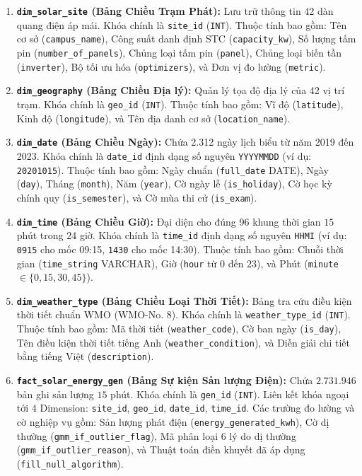 \documentclass[12pt, a4paper]{report}
\begin{document}
\begin{enumerate}[label=\arabic*., leftmargin=*]
    \item \textbf{\texttt{dim\_solar\_site} (Bảng Chiều Trạm Phát):} Lưu trữ thông tin 42 dàn quang điện áp mái. Khóa chính là \texttt{site\_id} (\texttt{INT}). Thuộc tính bao gồm: Tên cơ sở (\texttt{campus\_name}), Công suất danh định STC (\texttt{capacity\_kw}), Số lượng tấm pin (\texttt{number\_of\_panels}), Chủng loại tấm pin (\texttt{panel}), Chủng loại biến tần (\texttt{inverter}), Bộ tối ưu hóa (\texttt{optimizers}), và Đơn vị đo lường (\texttt{metric}).
    
    \item \textbf{\texttt{dim\_geography} (Bảng Chiều Địa lý):} Quản lý tọa độ địa lý của 42 vị trí trạm. Khóa chính là \texttt{geo\_id} (\texttt{INT}). Thuộc tính bao gồm: Vĩ độ (\texttt{latitude}), Kinh độ (\texttt{longitude}), và Tên địa danh cơ sở (\texttt{location\_name}).
    
    \item \textbf{\texttt{dim\_date} (Bảng Chiều Ngày):} Chứa 2.312 ngày lịch biểu từ năm 2019 đến 2023. Khóa chính là \texttt{date\_id} định dạng số nguyên \texttt{YYYYMMDD} (ví dụ: \texttt{20201015}). Thuộc tính bao gồm: Ngày chuẩn (\texttt{full\_date} DATE), Ngày (\texttt{day}), Tháng (\texttt{month}), Năm (\texttt{year}), Cờ ngày lễ (\texttt{is\_holiday}), Cờ học kỳ chính quy (\texttt{is\_semester}), và Cờ mùa thi cử (\texttt{is\_exam}).
    
    \item \textbf{\texttt{dim\_time} (Bảng Chiều Giờ):} Đại diện cho đúng 96 khung thời gian $15$ phút trong 24 giờ. Khóa chính là \texttt{time\_id} định dạng số nguyên \texttt{HHMI} (ví dụ: \texttt{0915} cho mốc 09:15, \texttt{1430} cho mốc 14:30). Thuộc tính bao gồm: Chuỗi thời gian (\texttt{time\_string} VARCHAR), Giờ (\texttt{hour} từ $0$ đến $23$), và Phút (\texttt{minute} $\in \{0, 15, 30, 45\}$).
    
    \item \textbf{\texttt{dim\_weather\_type} (Bảng Chiều Loại Thời Tiết):} Bảng tra cứu điều kiện thời tiết chuẩn WMO (WMO-No. 8). Khóa chính là \texttt{weather\_type\_id} (\texttt{INT}). Thuộc tính bao gồm: Mã thời tiết (\texttt{weather\_code}), Cờ ban ngày (\texttt{is\_day}), Tên điều kiện thời tiết tiếng Anh (\texttt{weather\_condition}), và Diễn giải chi tiết bằng tiếng Việt (\texttt{description}).
    
    \item \textbf{\texttt{fact\_solar\_energy\_gen} (Bảng Sự kiện Sản lượng Điện):} Chứa $2.731.946$ bản ghi sản lượng $15$ phút. Khóa chính là \texttt{gen\_id} (\texttt{INT}). Liên kết khóa ngoại tới 4 Dimension: \texttt{site\_id}, \texttt{geo\_id}, \texttt{date\_id}, \texttt{time\_id}. Các trường đo lường và cờ nghiệp vụ gồm: Sản lượng phát điện (\texttt{energy\_generated\_kwh}), Cờ dị thường (\texttt{gmm\_if\_outlier\_flag}), Mã phân loại 6 lý do dị thường (\texttt{gmm\_if\_outlier\_reason}), và Thuật toán điền khuyết đã áp dụng (\texttt{fill\_null\_algorithm}).
    

\end{enumerate}
\end{document}

